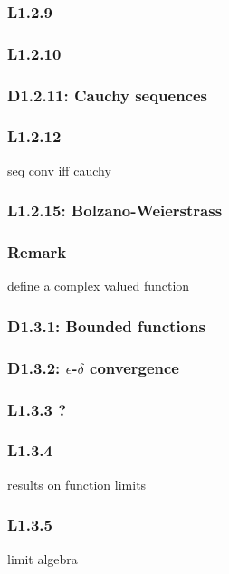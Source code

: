 \documentclass{article}
\begin{document}
\begin{multicols*}{3}
\subsubsection*{L1.2.9}

\subsubsection*{L1.2.10}

\subsubsection*{D1.2.11: Cauchy sequences}

\subsubsection*{L1.2.12}
seq conv iff cauchy

\subsubsection*{L1.2.15: Bolzano-Weierstrass}

\subsubsection*{Remark}
define a complex valued function

\subsubsection*{D1.3.1: Bounded functions}

\subsubsection*{D1.3.2: $\epsilon$-$\delta$ convergence}

\subsubsection*{L1.3.3 ?}

\subsubsection*{L1.3.4}
results on function limits

\subsubsection*{L1.3.5}
limit algebra


\end{multicols*}
\end{document}
